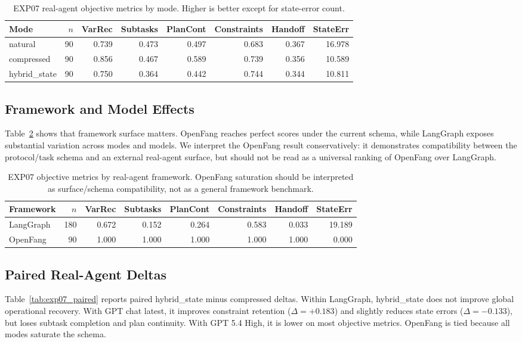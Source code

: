 \documentclass[11pt]{article}
\begin{document}
\begin{table}[ht]
\centering
\small
\begin{tabular}{lrrrrrrr}
\toprule
Mode & $n$ & VarRec & Subtasks & PlanCont & Constraints & Handoff & StateErr \\
\midrule
natural & 90 & 0.739 & 0.473 & 0.497 & 0.683 & 0.367 & 16.978 \\
compressed & 90 & 0.856 & 0.467 & 0.589 & 0.739 & 0.356 & 10.589 \\
hybrid\_state & 90 & 0.750 & 0.364 & 0.442 & 0.744 & 0.344 & 10.811 \\
\bottomrule
\end{tabular}
\caption{EXP07 real-agent objective metrics by mode. Higher is better except for state-error count.}
\label{tab:exp07_modes}
\end{table}

\subsection{Framework and Model Effects}
Table~\ref{tab:exp07_frameworks} shows that framework surface matters. OpenFang reaches perfect scores under the current schema, while LangGraph exposes substantial variation across modes and models. We interpret the OpenFang result conservatively: it demonstrates compatibility between the protocol/task schema and an external real-agent surface, but should not be read as a universal ranking of OpenFang over LangGraph.

\begin{table}[ht]
\centering
\small
\begin{tabular}{lrrrrrrr}
\toprule
Framework & $n$ & VarRec & Subtasks & PlanCont & Constraints & Handoff & StateErr \\
\midrule
LangGraph & 180 & 0.672 & 0.152 & 0.264 & 0.583 & 0.033 & 19.189 \\
OpenFang & 90 & 1.000 & 1.000 & 1.000 & 1.000 & 1.000 & 0.000 \\
\bottomrule
\end{tabular}
\caption{EXP07 objective metrics by real-agent framework. OpenFang saturation should be interpreted as surface/schema compatibility, not as a general framework benchmark.}
\label{tab:exp07_frameworks}
\end{table}

\subsection{Paired Real-Agent Deltas}
Table~\ref{tab:exp07_paired} reports paired hybrid\_state minus compressed deltas. Within LangGraph, hybrid\_state does not improve global operational recovery. With GPT chat latest, it improves constraint retention ($\Delta=+0.183$) and slightly reduces state errors ($\Delta=-0.133$), but loses subtask completion and plan continuity. With GPT 5.4 High, it is lower on most objective metrics. OpenFang is tied because all modes saturate the schema.
\end{document}

